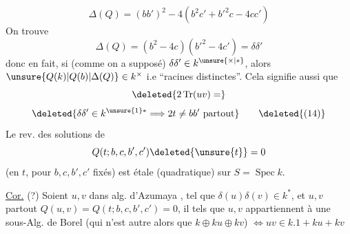 \[ \Delta(Q)=(bb')^2-4(b^2c'+b'^2c-4cc') \]
On trouve
\[ \Delta(Q)=(b^2-4c)(b'^2-4c')=\delta\delta' \tag*{(13)} \]
donc en fait, si \deleted{\unsure{(}} (comme on a supposé) $\delta\delta'\in k^{\unsure{\times|*}}$, alors $\unsure{Q(k)|Q(b)|\Delta(Q)}\in k^{\times}$ i.e ``racines distinctes''. Cela signifie aussi que 
\[ \deleted{2\operatorname{Tr}(uv)=} \]
\[ \deleted{\delta\delta'\in k^{\unsure{1}*}\Longrightarrow 2t\ne bb'\ \text{partout}}\tag*{\deleted{(14)}} \]
 Le rev. des solutions de
\[ Q(t;b,c,b',c')\deleted{\unsure{t}}=0 \]
(en $t$, pour $b,c,b',c'$ fixés) est étale (quadratique) sur $S=\operatorname{Spec}k$.

\uline{Cor.} (?) Soient $u,v$ dans alg. d'Azumaya , tel que $\delta(u)\delta(v)\in k^*$,  et $u,v$ partout   $Q(u,v)=Q(t;b,c,b',c')=0$,  il  tels que $u,v$ appartiennent à une  sous-Alg. de Borel (qui n'est autre alors que $k\oplus ku\oplus kv$) $\Longleftrightarrow uv\in k.1+ku+kv$

